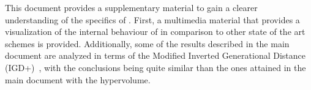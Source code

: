 This document provides a supplementary material to gain a clearer understanding of the 
specifics of \VSDMOEA{}.
%
First, a multimedia material that provides a visualization of the internal behaviour
of \VSDMOEA{} in comparison to other state of the art schemes is provided.
%
Additionally, some of the results described in the main document are analyzed in terms
of the Modified Inverted Generational Distance (IGD+)~\cite{Joel:Inverted_Generational_Distance_Plus}, 
with the conclusions being quite similar than the ones attained in the main document with
the hypervolume.

